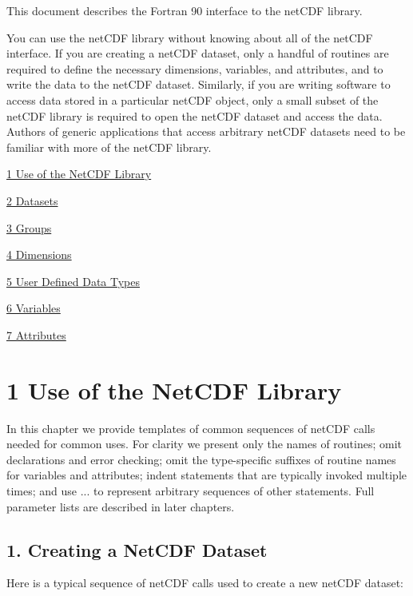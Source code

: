 This document describes the Fortran 90 interface to the net\+C\+DF library.

You can use the net\+C\+DF library without knowing about all of the net\+C\+DF interface. If you are creating a net\+C\+DF dataset, only a handful of routines are required to define the necessary dimensions, variables, and attributes, and to write the data to the net\+C\+DF dataset. Similarly, if you are writing software to access data stored in a particular net\+C\+DF object, only a small subset of the net\+C\+DF library is required to open the net\+C\+DF dataset and access the data. Authors of generic applications that access arbitrary net\+C\+DF datasets need to be familiar with more of the net\+C\+DF library.


\begin{DoxyItemize}
\item \hyperlink{f90-use-of-the-netcdf-library}{1 Use of the Net\+C\+DF Library}
\item \hyperlink{f90_datasets}{2 Datasets}
\item \hyperlink{f90_groups}{3 Groups}
\item \hyperlink{f90_dimensions}{4 Dimensions}
\item \hyperlink{f90-user-defined-data-types}{5 User Defined Data Types}
\item \hyperlink{f90-variables}{6 Variables}
\item \hyperlink{f90-attributes}{7 Attributes} 
\end{DoxyItemize}\hypertarget{f90-use-of-the-netcdf-library}{}\section{1 Use of the Net\+C\+DF Library}\label{f90-use-of-the-netcdf-library}
In this chapter we provide templates of common sequences of net\+C\+DF calls needed for common uses. For clarity we present only the names of routines; omit declarations and error checking; omit the type-\/specific suffixes of routine names for variables and attributes; indent statements that are typically invoked multiple times; and use ... to represent arbitrary sequences of other statements. Full parameter lists are described in later chapters.\hypertarget{f90-use-of-the-netcdf-library_f90-creating-a-netcdf-dataset}{}\subsection{1. Creating a Net\+C\+D\+F Dataset }\label{f90-use-of-the-netcdf-library_f90-creating-a-netcdf-dataset}
Here is a typical sequence of net\+C\+DF calls used to create a new net\+C\+DF dataset\+:



